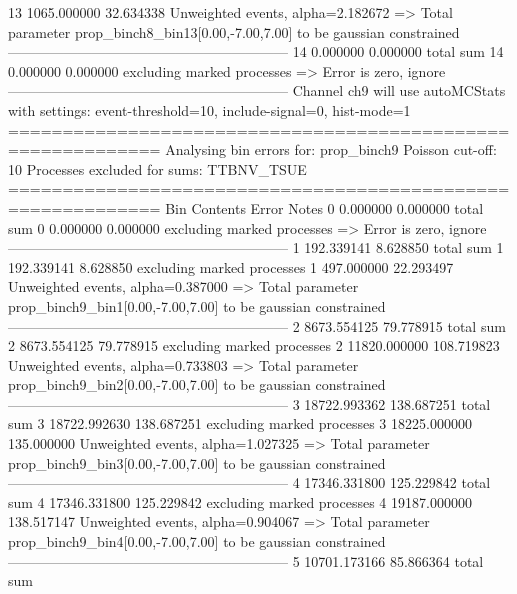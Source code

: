 13         1065.000000     32.634338       Unweighted events, alpha=2.182672
  => Total parameter prop_binch8_bin13[0.00,-7.00,7.00] to be gaussian constrained
------------------------------------------------------------
14         0.000000        0.000000        total sum                     
14         0.000000        0.000000        excluding marked processes    
  => Error is zero, ignore      
------------------------------------------------------------
Channel ch9 will use autoMCStats with settings: event-threshold=10, include-signal=0, hist-mode=1
============================================================
Analysing bin errors for: prop_binch9
Poisson cut-off: 10
Processes excluded for sums: TTBNV_TSUE
============================================================
Bin        Contents        Error           Notes                         
0          0.000000        0.000000        total sum                     
0          0.000000        0.000000        excluding marked processes    
  => Error is zero, ignore      
------------------------------------------------------------
1          192.339141      8.628850        total sum                     
1          192.339141      8.628850        excluding marked processes    
1          497.000000      22.293497       Unweighted events, alpha=0.387000
  => Total parameter prop_binch9_bin1[0.00,-7.00,7.00] to be gaussian constrained
------------------------------------------------------------
2          8673.554125     79.778915       total sum                     
2          8673.554125     79.778915       excluding marked processes    
2          11820.000000    108.719823      Unweighted events, alpha=0.733803
  => Total parameter prop_binch9_bin2[0.00,-7.00,7.00] to be gaussian constrained
------------------------------------------------------------
3          18722.993362    138.687251      total sum                     
3          18722.992630    138.687251      excluding marked processes    
3          18225.000000    135.000000      Unweighted events, alpha=1.027325
  => Total parameter prop_binch9_bin3[0.00,-7.00,7.00] to be gaussian constrained
------------------------------------------------------------
4          17346.331800    125.229842      total sum                     
4          17346.331800    125.229842      excluding marked processes    
4          19187.000000    138.517147      Unweighted events, alpha=0.904067
  => Total parameter prop_binch9_bin4[0.00,-7.00,7.00] to be gaussian constrained
------------------------------------------------------------
5          10701.173166    85.866364       total sum                     

